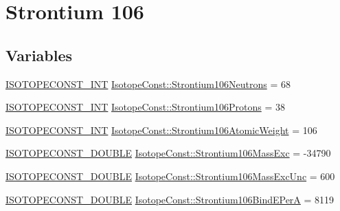 \hypertarget{group___isotope_const-_strontium-_sr106}{}\section{Strontium 106}
\label{group___isotope_const-_strontium-_sr106}
\subsection*{Variables}
\begin{DoxyCompactItemize}
\item 
\mbox{\hyperlink{group___isotope_const-_macros_ga5f18360b3e99483a35c32d789e62621c}{I\+S\+O\+T\+O\+P\+E\+C\+O\+N\+S\+T\+\_\+\+I\+NT}} \mbox{\hyperlink{group___isotope_const-_strontium-_sr106_ga9f0dbbc81a04f750b29254d8193f21c0}{Isotope\+Const\+::\+Strontium106\+Neutrons}} = 68
\item 
\mbox{\hyperlink{group___isotope_const-_macros_ga5f18360b3e99483a35c32d789e62621c}{I\+S\+O\+T\+O\+P\+E\+C\+O\+N\+S\+T\+\_\+\+I\+NT}} \mbox{\hyperlink{group___isotope_const-_strontium-_sr106_gaf5a72da8d139bca7e14b73e1f891e486}{Isotope\+Const\+::\+Strontium106\+Protons}} = 38
\item 
\mbox{\hyperlink{group___isotope_const-_macros_ga5f18360b3e99483a35c32d789e62621c}{I\+S\+O\+T\+O\+P\+E\+C\+O\+N\+S\+T\+\_\+\+I\+NT}} \mbox{\hyperlink{group___isotope_const-_strontium-_sr106_ga5e13387502e1eba590290b69286d8fcf}{Isotope\+Const\+::\+Strontium106\+Atomic\+Weight}} = 106
\item 
\mbox{\hyperlink{group___isotope_const-_macros_ga8f45a7272ce02c0b4c65c44636ed719a}{I\+S\+O\+T\+O\+P\+E\+C\+O\+N\+S\+T\+\_\+\+D\+O\+U\+B\+LE}} \mbox{\hyperlink{group___isotope_const-_strontium-_sr106_ga124ab6e98ea87ef97f4c45e2865b1389}{Isotope\+Const\+::\+Strontium106\+Mass\+Exc}} = -\/34790
\item 
\mbox{\hyperlink{group___isotope_const-_macros_ga8f45a7272ce02c0b4c65c44636ed719a}{I\+S\+O\+T\+O\+P\+E\+C\+O\+N\+S\+T\+\_\+\+D\+O\+U\+B\+LE}} \mbox{\hyperlink{group___isotope_const-_strontium-_sr106_gab2aaa159da49bfb3dd92f298d2256ab8}{Isotope\+Const\+::\+Strontium106\+Mass\+Exc\+Unc}} = 600
\item 
\mbox{\hyperlink{group___isotope_const-_macros_ga8f45a7272ce02c0b4c65c44636ed719a}{I\+S\+O\+T\+O\+P\+E\+C\+O\+N\+S\+T\+\_\+\+D\+O\+U\+B\+LE}} \mbox{\hyperlink{group___isotope_const-_strontium-_sr106_ga618e8f38e0f552d04c3663ee046d964e}{Isotope\+Const\+::\+Strontium106\+Bind\+E\+PerA}} = 8119
\item 

\end{DoxyCompactItemize}
